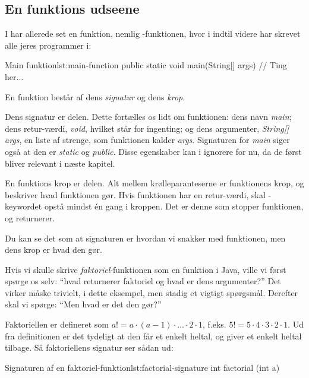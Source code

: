 \fi

	\subsection{En funktions udseene}

		I har allerede set en funktion, nemlig -funktionen, hvor i
		indtil videre har skrevet alle jeres programmer i:

		\begin{JavaCode}{Main funktion}{lst:main-function}
			public static void main(String[] args) {
				// Ting her...
			}
		\end{JavaCode}

		En funktion består af dens \emph{signatur} og dens \emph{krop}.

		Dens signatur er  delen.
		Dette fortælles os lidt om funktionen: dens navn \emph{main}; dens
		retur-værdi, \emph{void}, hvilket står for ingenting; og dens argumenter,
		\emph{String[] args}, en liste af strenge, som funktionen kalder \emph{args}.
		Signaturen for \emph{main} siger også at den er \emph{static} og
		\emph{public}. Disse egenskaber kan i ignorere for nu, da de først bliver
		relevant i næste kapitel.

		En funktions krop er  delen. Alt mellem
		krølleparanteserne er funktionens krop, og beskriver hvad funktionen gør.
		Hvis funktionen har en retur-værdi, skal -keywordet opstå
		mindst én gang i kroppen. Det er denne som stopper funktionen, og returnerer.

		Du kan se det som at signaturen er hvordan vi snakker med funktionen, men
		dens krop er hvad den gør.

		Hvis vi skulle skrive \emph{faktoriel}-funktionen som en funktion i Java,
		ville vi først spørge os selv: ``hvad returnerer faktoriel og hvad er dens
		argumenter?'' Det virker måske trivielt, i dette eksempel, men stadig et
		vigtigt spørgsmål. Derefter skal vi spørge: ``Men hvad er det den gør?''

		Faktoriellen er defineret som \(a! = a \cdot (a-1) \cdot \dots \cdot 2 \cdot 1\),
		f.eks. \(5! = 5 \cdot 4 \cdot 3 \cdot 2 \cdot 1\). Ud fra definitionen er det
		tydeligt at den får et enkelt heltal, og giver et enkelt heltal tilbage. Så
		faktoriellens signatur ser sådan ud:

		\begin{JavaCode}{Signaturen af en faktoriel-funktion}{lst:factorial-signature}
			int factorial (int a)
		\end{JavaCode}


